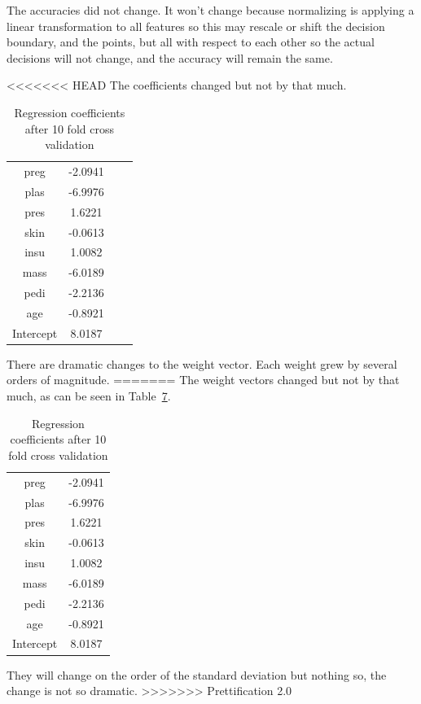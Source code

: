 \documentclass{article}
\begin{document}
\begin{table}[H]
\begin{table}[H]
\begin{table}[H]
The accuracies did not change. It won't change because normalizing is applying a linear transformation to all features so this may rescale or shift the decision boundary, and the points, but all with respect to each other so the actual decisions will not change, and the accuracy will remain the same. 

<<<<<<< HEAD
The coefficients changed but not by that much. 
\begin{table}[H]
    \begin{center}
     \caption{Coefficients after normalizing}
    \begin{tabular}{|c|c|c|c|}
   \hline
preg          &        -2.0941\\
plas             &    -6.9976\\
pres               &    1.6221\\
skin              &  -0.0613\\
insu               &   1.0082\\
mass              &    -6.0189\\
pedi             &    -2.2136\\
age            &       -0.8921\\
Intercept      &        8.0187\\ %
\hline
    \end{tabular}
    \end{center}
\end{table}

There are dramatic changes to the weight vector. Each weight grew by several orders of magnitude. 
=======
The weight vectors changed but not by that much, as can be seen in Table~\ref{tab:coeffscv}.
\begin{table}[h]
    \begin{center}
    \begin{tabular}{|c|c|}
   \hline
preg&                 -2.0941\\
plas   &              -6.9976\\
pres  &                1.6221\\
skin   &              -0.0613\\
insu  &                1.0082\\
mass  &               -6.0189\\
pedi   &              -2.2136\\
age   &               -0.8921\\   \hline
Intercept      &       8.0187   \\     \hline
    \end{tabular} \caption{Regression coefficients after 10 fold cross validation}\label{tab:coeffscv}
    \end{center}
\end{table}
They will change on the order of the standard deviation but nothing so, the change is not so dramatic. 
>>>>>>> Prettification 2.0


\end{table}
\end{table}
\end{table}
\end{document}
